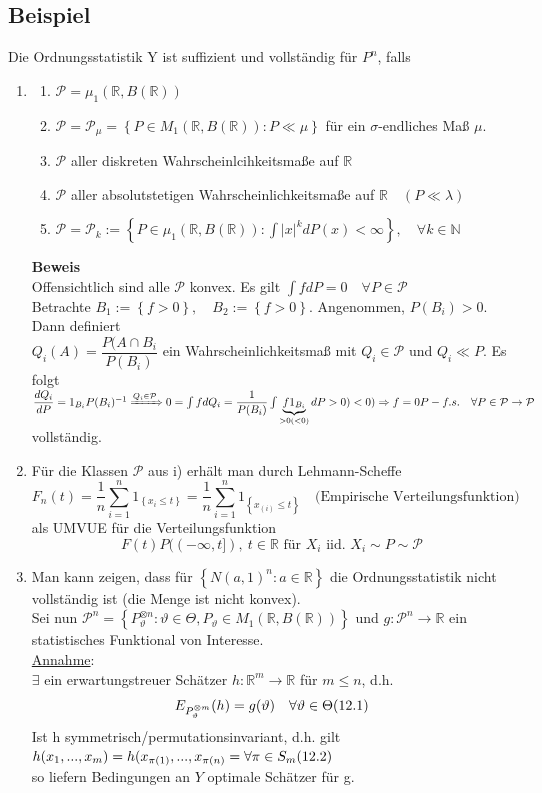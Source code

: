\documentclass[german,10pt,oneside, fleqn, a4paper]{article}
\let\marvosymLightning\Lightning
\newcommand {\R}	{\mathbb{R}}
\newcommand {\N}	{\mathbb{N}}
\newcommand{\Ra}	{\Rightarrow}
\newcommand{\ra}{\rightarrow}
\newcommand{\sm}[2][\infty]{\sum\limits_{#2}^{#1}}
\newcommand{\brac}[1]{\left\lbrace #1\right\rbrace}
\newcommand{\mc}[1]{\mathcal{#1}}
\newcommand{\beweis}{\textbf{Beweis}\\}
\newcommand{\1}[1]{1_{#1}}
\newcommand{\2}[1]{\1{\brac{#1}}}
\newcommand{\wid}{\text{\marvosymLightning}}
\newcommand{\p}{\mc{P}}
\newcommand{\sumi}{\sm[n]{i=1}}
\newcommand{\qf}{\quad\forall}
\newcommand{\stuff}{{\otimes n}}
\begin{document}
\subsection{Beispiel}
\label{12.3}
Die Ordnungsstatistik Y ist suffizient und vollständig für $P^n$, falls
\begin{enumerate}[label=(\roman*)]
\item\begin{enumerate}[label=(\alph*)]
	\item $\p=\mu_1(\R,B(\R))$
	\item $\p=\p_\mu=\brac{P\in M_1(\R,B(\R)):P\ll\mu}$ für ein $\sigma$-endliches Maß $\mu$.
	\item $\p$ aller diskreten Wahrscheinlcihkeitsmaße auf $\R$
	\item $\p$ aller absolutstetigen Wahrscheinlichkeitsmaße auf $\R\quad (P\ll\lambda)$
	\item $\p=\p_k:=\brac{P\in\mu_1(\R,B(\R)):\int|x|^kdP(x)<\infty},\qf k\in\N$
\end{enumerate}
\beweis
Offensichtlich sind alle $\p$ konvex. Es gilt $\int fdP=0\qf P\in\p$\\
Betrachte $B_1:=\brac{f>0},\quad B_2:=\brac{f>0}$. Angenommen, $P(B_i)>0$. Dann definiert \\
$Q_i(A)=\dfrac{P(A\cap B_i}{P(B_i)}$ ein Wahrscheinlichkeitsmaß mit $Q_i\in\p$ und $Q_i\ll P$. Es folgt\\
$\dfrac{dQ_i}{dP}=1_{B_i}P(B_i)^{-1}\xRightarrow{Q_i\in\p} 0=\int fdQ_i=\dfrac{1}{P(B_i)}\int \underbrace{f1_{B_i}}_{>0(<0)}dP>0)<0)\\
\Ra f=0 P-f.s.\qf P\in\p\ra\p$ vollständig. \ \ \ \wid

\item Für die Klassen $\p$ aus i) erhält man durch Lehmann-Scheffe \[
F_n(t)=\dfrac{1}{n}\sumi 1_{\brac{x_i\leq t}}=\dfrac{1}{n}\sumi 1_{\brac{x_{(i)}\leq t}}\quad\text{(Empirische Verteilungsfunktion)}\]
als UMVUE für die Verteilungsfunktion \[F(t)P((-\infty,t]),\ t\in\R\text{ für }X_i\text{ iid. }X_i\sim P\sim\p\]

\item Man kann zeigen, dass für $\brac{N(a,1)^n:a\in\R}$ die Ordnungsstatistik nicht vollständig ist (die Menge ist nicht konvex).\\
Sei nun $\p^n=\brac{P_\vartheta^\stuff:\vartheta\in\Theta, P_\vartheta\in M_1(\R,B(\R))}$ und $g:\p^n\ra\R$ ein statistisches Funktional von Interesse.\\
\underline{Annahme}:\\
$\exists$ ein erwartungstreuer Schätzer $h:\R^m\ra\R$ für $m\leq n$, d.h.\[
E_{P_\vartheta^{\otimes m}}(h)=g(\vartheta)\qf\vartheta\in\Theta\hfill(12.1)\]
Ist h symmetrisch/permutationsinvariant, d.h. gilt $h(x_1,...,x_m)=h(x_{\pi(1)},...,x_{\pi(n)}=\forall\pi\in S_m\hfill (12.2)$\\
so liefern Bedingungen an $Y$ optimale Schätzer für g.
\end{enumerate}
\end{document}
